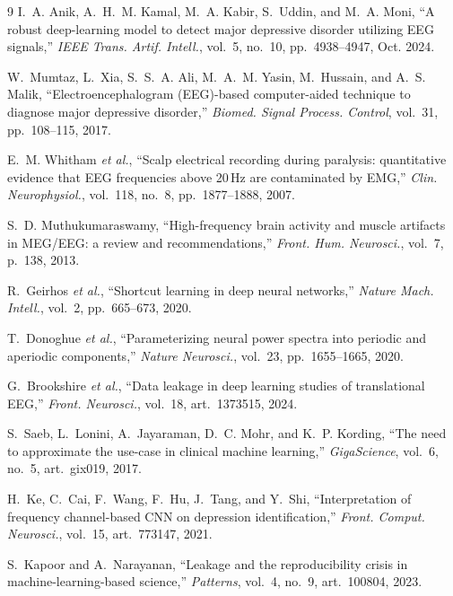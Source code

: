 \documentclass[10pt,conference]{IEEEtran}
\begin{document}
\balance
\begin{thebibliography}{9}
I.~A. Anik, A.~H.~M. Kamal, M.~A. Kabir, S.~Uddin, and M.~A. Moni,
``A robust deep-learning model to detect major depressive disorder utilizing EEG
signals,'' \emph{IEEE Trans. Artif. Intell.}, vol.~5, no.~10, pp.~4938--4947,
Oct. 2024.

W.~Mumtaz, L.~Xia, S.~S.~A. Ali, M.~A.~M. Yasin, M.~Hussain, and A.~S. Malik,
``Electroencephalogram (EEG)-based computer-aided technique to diagnose major
depressive disorder,'' \emph{Biomed. Signal Process. Control}, vol.~31,
pp.~108--115, 2017.

E.~M. Whitham \emph{et al.}, ``Scalp electrical recording during paralysis:
quantitative evidence that EEG frequencies above 20\,Hz are contaminated by
EMG,'' \emph{Clin. Neurophysiol.}, vol.~118, no.~8, pp.~1877--1888, 2007.

S.~D. Muthukumaraswamy, ``High-frequency brain activity and muscle artifacts in
MEG/EEG: a review and recommendations,'' \emph{Front. Hum. Neurosci.}, vol.~7,
p.~138, 2013.

R.~Geirhos \emph{et al.}, ``Shortcut learning in deep neural networks,''
\emph{Nature Mach. Intell.}, vol.~2, pp.~665--673, 2020.

T.~Donoghue \emph{et al.}, ``Parameterizing neural power spectra into periodic
and aperiodic components,'' \emph{Nature Neurosci.}, vol.~23, pp.~1655--1665,
2020.

G.~Brookshire \emph{et al.}, ``Data leakage in deep learning studies of
translational EEG,'' \emph{Front. Neurosci.}, vol.~18, art.~1373515, 2024.

S.~Saeb, L.~Lonini, A.~Jayaraman, D.~C. Mohr, and K.~P. Kording, ``The need to
approximate the use-case in clinical machine learning,'' \emph{GigaScience},
vol.~6, no.~5, art.~gix019, 2017.

H.~Ke, C.~Cai, F.~Wang, F.~Hu, J.~Tang, and Y.~Shi, ``Interpretation of
frequency channel-based CNN on depression identification,''
\emph{Front. Comput. Neurosci.}, vol.~15, art.~773147, 2021.

S.~Kapoor and A.~Narayanan, ``Leakage and the reproducibility crisis in
machine-learning-based science,'' \emph{Patterns}, vol.~4, no.~9, art.~100804,
2023.

\end{thebibliography}
\end{document}
